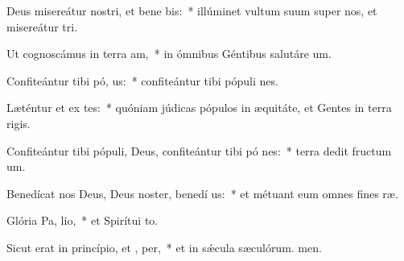 \item Deus misereátur nostri, et bene bis:~* illúminet vultum suum super nos, et misereátur tri.
\item Ut cognoscámus in terra  am,~* in ómnibus Géntibus salutáre um.
\item Confiteántur tibi pó, us:~* confiteántur tibi pópuli nes.
\item Læténtur et ex tes:~* quóniam júdicas pópulos in æquitáte, et Gentes in terra rigis.
\item Confiteántur tibi pópuli, Deus, confiteántur tibi pó nes:~* terra dedit fructum um.
\item Benedícat nos Deus, Deus noster, benedí  us:~* et métuant eum omnes fines ræ.
\item Glória Pa,  lio,~* et Spirítui to.
\item Sicut erat in princípio, et ,  per,~* et in sǽcula sæculórum. men.

